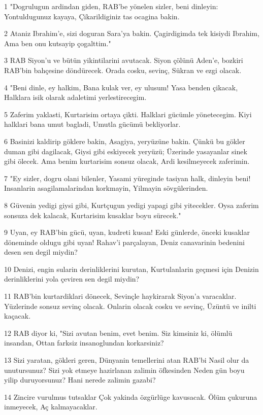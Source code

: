 \par 1 "Dogrulugun ardindan giden, RAB'be yönelen sizler, beni dinleyin: Yontuldugunuz kayaya, Çikarildiginiz tas ocagina bakin.
\par 2 Ataniz Ibrahim'e, sizi doguran Sara'ya bakin. Çagirdigimda tek kisiydi Ibrahim, Ama ben onu kutsayip çogalttim."
\par 3 RAB Siyon'u ve bütün yikintilarini avutacak. Siyon çölünü Aden'e, bozkiri RAB'bin bahçesine döndürecek. Orada cosku, sevinç, Sükran ve ezgi olacak.
\par 4 "Beni dinle, ey halkim, Bana kulak ver, ey ulusum! Yasa benden çikacak, Halklara isik olarak adaletimi yerlestirecegim.
\par 5 Zaferim yaklasti, Kurtarisim ortaya çikti. Halklari gücümle yönetecegim. Kiyi halklari bana umut bagladi, Umutla gücümü bekliyorlar.
\par 6 Basinizi kaldirip göklere bakin, Asagiya, yeryüzüne bakin. Çünkü bu gökler duman gibi dagilacak, Giysi gibi eskiyecek yeryüzü; Üzerinde yasayanlar sinek gibi ölecek. Ama benim kurtarisim sonsuz olacak, Ardi kesilmeyecek zaferimin.
\par 7 "Ey sizler, dogru olani bilenler, Yasami yüreginde tasiyan halk, dinleyin beni! Insanlarin asagilamalarindan korkmayin, Yilmayin sövgülerinden.
\par 8 Güvenin yedigi giysi gibi, Kurtçugun yedigi yapagi gibi yitecekler. Oysa zaferim sonsuza dek kalacak, Kurtarisim kusaklar boyu sürecek."
\par 9 Uyan, ey RAB'bin gücü, uyan, kudreti kusan! Eski günlerde, önceki kusaklar döneminde oldugu gibi uyan! Rahav'i parçalayan, Deniz canavarinin bedenini desen sen degil miydin?
\par 10 Denizi, engin sularin derinliklerini kurutan, Kurtulanlarin geçmesi için Denizin derinliklerini yola çeviren sen degil miydin?
\par 11 RAB'bin kurtardiklari dönecek, Sevinçle haykirarak Siyon'a varacaklar. Yüzlerinde sonsuz sevinç olacak. Onlarin olacak cosku ve sevinç, Üzüntü ve inilti kaçacak.
\par 12 RAB diyor ki, "Sizi avutan benim, evet benim. Siz kimsiniz ki, ölümlü insandan, Ottan farksiz insanoglundan korkarsiniz?
\par 13 Sizi yaratan, gökleri geren, Dünyanin temellerini atan RAB'bi Nasil olur da unutursunuz? Sizi yok etmeye hazirlanan zalimin öfkesinden Neden gün boyu yilip duruyorsunuz? Hani nerede zalimin gazabi?
\par 14 Zincire vurulmus tutsaklar Çok yakinda özgürlüge kavusacak. Ölüm çukuruna inmeyecek, Aç kalmayacaklar.
